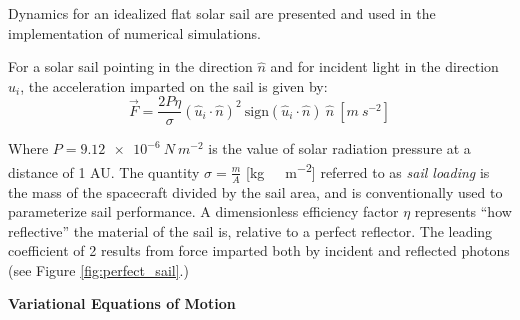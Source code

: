 Dynamics for an idealized flat solar sail are presented and used in the implementation of numerical simulations.

For a solar sail pointing in the direction \(\hat{n}\) and for incident light in the direction \(\hat{u}_i\), the acceleration imparted on the sail is given by:
\begin{equation}
  \vec{F} = \frac{2 P \eta}{\sigma}(\hat{u}_i \cdot \hat{n})^2 \ \mathrm{sign}(\hat{u}_i \cdot \hat{n}) \ \hat{n}
  \ [\unit{m\ s^{-2}}] \label{eq:solar_force}
\end{equation}

Where \(P = \qty{9.12e-6}{N\ m^{-2}}\) is the value of solar radiation pressure at a distance of 1 AU. The quantity \(\sigma = \frac{m}{A}\) [\unit{kg\ m^{-2}}] referred to as \textit{sail loading} is the mass of the spacecraft divided by the sail area, and is conventionally used to parameterize sail performance. A dimensionless efficiency factor \(\eta\) represents ``how reflective'' the material of the sail is, relative to a perfect reflector. The leading coefficient of 2 results from force imparted both by incident and reflected photons (see Figure \ref{fig:perfect_sail}.)

\textbf{Variational Equations of Motion}

